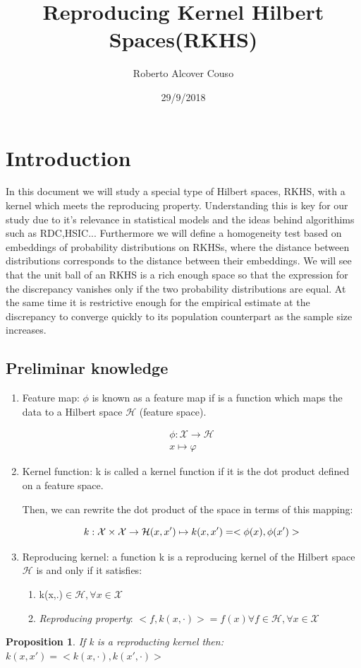 \documentclass[8pt,a4paper]{article}
\theoremstyle{plain}
\newtheorem{prop}[thm]{Proposition}
\theoremstyle{definition}
\theoremstyle{remark}
\begin{document}
\title{Reproducing Kernel Hilbert Spaces(RKHS)}
\author{Roberto Alcover Couso}
\date{29/9/2018}
\begin{titlepage}
\maketitle
\end{titlepage}
\section{Introduction}
In this document we will study a special type of Hilbert spaces, RKHS, with a kernel which meets the reproducing property. Understanding this is key for our study due to it's relevance in statistical models and the ideas behind algorithims such as RDC,HSIC...
Furthermore we will define a homogeneity test based on embeddings of probability distributions on RKHSs, where the distance between distributions corresponds to the distance between their embeddings. We will see that the unit ball of an RKHS is a rich enough space so that the expression for the discrepancy vanishes only if the two probability distributions are equal. At the same time it is restrictive enough for the empirical estimate at the discrepancy to converge quickly to its population counterpart as the sample size increases.
\subsection{Preliminar knowledge}

\begin{enumerate}
\item \textsf{Feature map}: $\phi$ is known as a feature map if is a function which maps the data to a Hilbert space $\mathcal{H}$ (feature space).

\begin{align*}
\phi : \mathcal{X} \rightarrow \mathcal{H} \\
x \mapsto \varphi
\end{align*}
\item \textsf{Kernel function}:
k is called a kernel function if it is the dot product defined on a feature space.

Then, we can rewrite the dot product of the space in terms of this mapping:

$$
k: \mathcal{X}\times\mathcal{X} \rightarrow \mathcal{H} \\
(x,x') \mapsto k(x,x')= <\phi(x),\phi(x') >$$
\item \textsf{Reproducing kernel}:
a function k is a reproducing kernel of the Hilbert space $\mathcal{H}$ is and only if it satisfies:
\begin{enumerate}
\item k(x,.)$\in \mathcal{H}, \forall x \in \mathcal{X}$
\item \textit{Reproducing property}: $<f,k(x,\cdot)> = f(x) \forall f \in \mathcal{H} , \forall x \in \mathcal{X}$
\end{enumerate}
\end{enumerate}
\begin{prop}
If k is a reproducting kernel then: $k(x,x') = <k(x,\cdot),k(x',\cdot)>$
\end{prop}
\end{document}
